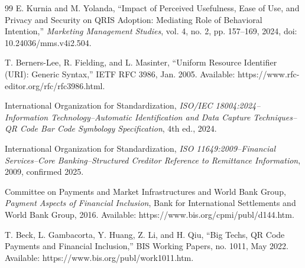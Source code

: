\begin{thebibliography}{99}
E. Kurnia and M. Yolanda, ``Impact of Perceived Usefulness, Ease of Use, and Privacy and Security on QRIS Adoption: Mediating Role of Behavioral Intention,'' \textit{Marketing Management Studies}, vol. 4, no. 2, pp. 157--169, 2024, doi: 10.24036/mms.v4i2.504.

T. Berners-Lee, R. Fielding, and L. Masinter, ``Uniform Resource Identifier (URI): Generic Syntax,'' IETF RFC 3986, Jan. 2005. Available: https://www.rfc-editor.org/rfc/rfc3986.html.

International Organization for Standardization, \textit{ISO/IEC 18004:2024--Information Technology--Automatic Identification and Data Capture Techniques--QR Code Bar Code Symbology Specification}, 4th ed., 2024.

International Organization for Standardization, \textit{ISO 11649:2009--Financial Services--Core Banking--Structured Creditor Reference to Remittance Information}, 2009, confirmed 2025.

Committee on Payments and Market Infrastructures and World Bank Group, \textit{Payment Aspects of Financial Inclusion}, Bank for International Settlements and World Bank Group, 2016. Available: https://www.bis.org/cpmi/publ/d144.htm.

T. Beck, L. Gambacorta, Y. Huang, Z. Li, and H. Qiu, ``Big Techs, QR Code Payments and Financial Inclusion,'' BIS Working Papers, no. 1011, May 2022. Available: https://www.bis.org/publ/work1011.htm.

\end{thebibliography}


